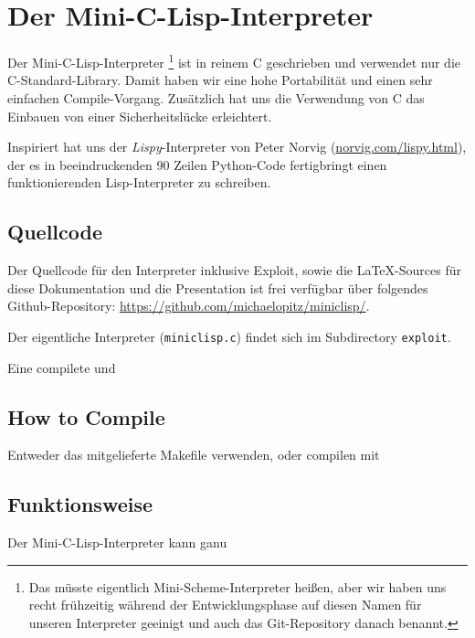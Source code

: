 \documentclass{sig-alternate}
\begin{document}
\section[Mini-C-Lisp]{Der Mini-C-Lisp-Interpreter}
Der Mini-C-Lisp-Interpreter  \footnote{Das müsste eigentlich Mini-Scheme-Interpreter heißen, aber wir
  haben uns recht frühzeitig während der Entwicklungsphase auf diesen Namen
  für unseren Interpreter geeinigt und auch das Git-Repository danach benannt.
} ist in reinem C geschrieben und verwendet nur die
C-Standard-Library. Damit haben wir eine hohe Portabilität und einen sehr
einfachen Compile-Vorgang. Zusätzlich hat uns die Verwendung von C das Einbauen
von einer Sicherheitslücke erleichtert.
\par
Inspiriert hat uns der \emph{Lispy}-Interpreter von Peter Norvig
(\url{norvig.com/lispy.html}), der es in beeindruckenden 90 Zeilen Python-Code
fertigbringt einen funktionierenden Lisp-Interpreter zu schreiben.

\subsection[Quellcode]{Quellcode}
Der Quellcode für den Interpreter inklusive Exploit, sowie die \LaTeX-Sources
für diese Dokumentation und die Presentation ist frei verfügbar 
über folgendes Github-Repository: 
\url{https://github.com/michaelopitz/miniclisp/}.
\par
Der eigentliche Interpreter (\texttt{miniclisp.c}) findet sich im Subdirectory
\texttt{exploit}.
\par
Eine compilete und


\subsection[Compiling]{How to Compile}
Entweder das mitgelieferte Makefile verwenden, oder compilen mit


\subsection[Funktionsweise]{Funktionsweise}
Der Mini-C-Lisp-Interpreter kann ganu



\end{document}
